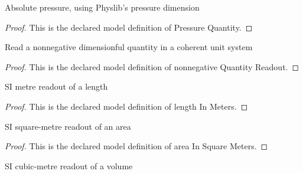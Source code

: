 \begin{definition}
  \label{def:physics:phyx-mini-0334:phyxminiproblems-problemphyxmini0334-pressurequantity}
  Absolute pressure, using Physlib's pressure dimension
\end{definition}
\begin{proof}
  This is the declared model definition of Pressure Quantity.
\end{proof}
\begin{definition}
  \label{def:physics:phyx-mini-0334:phyxminiproblems-problemphyxmini0334-nonnegativequantityreadout}
  Read a nonnegative dimensionful quantity in a coherent unit system
\end{definition}
\begin{proof}
  This is the declared model definition of nonnegative Quantity Readout.
\end{proof}
\begin{definition}
  \label{def:physics:phyx-mini-0334:phyxminiproblems-problemphyxmini0334-lengthinmeters}
  SI metre readout of a length
\end{definition}
\begin{proof}
  This is the declared model definition of length In Meters.
\end{proof}
\begin{definition}
  \label{def:physics:phyx-mini-0334:phyxminiproblems-problemphyxmini0334-areainsquaremeters}
  SI square-metre readout of an area
\end{definition}
\begin{proof}
  This is the declared model definition of area In Square Meters.
\end{proof}
\begin{definition}
  \label{def:physics:phyx-mini-0334:phyxminiproblems-problemphyxmini0334-volumeincubicmeters}
  SI cubic-metre readout of a volume
\end{definition}
